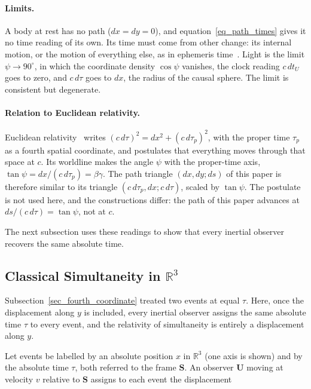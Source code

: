 \documentclass[anonymous]{iopjournal}
\begin{document}
\paragraph{Limits.} A body at rest has no path ($dx=dy=0$), and equation~\eqref{eq_path_times} gives it no time reading of its own. Its time must come from other change: its internal motion, or the motion of everything else, as in ephemeris time~\cite{Barbour2009}. Light is the limit $\psi\to90^\circ$, in which the coordinate density $\cos\psi$ vanishes, the clock reading $c\,dt_U$ goes to zero, and $c\,d\tau$ goes to $dx$, the radius of the causal sphere. The limit is consistent but degenerate.

\paragraph{Relation to Euclidean relativity.} Euclidean relativity~\cite{Montanus2001,Almeida2001} writes $(c\,d\tau)^2=dx^2+(c\,d\tau_p)^2$, with the proper time $\tau_p$ as a fourth spatial coordinate, and postulates that everything moves through that space at $c$. Its worldline makes the angle $\psi$ with the proper-time axis, $\tan\psi=dx/(c\,d\tau_p)=\beta\gamma$. The path triangle $(dx,dy;ds)$ of this paper is therefore similar to its triangle $(c\,d\tau_p,dx;c\,d\tau)$, scaled by $\tan\psi$. The postulate is not used here, and the constructions differ: the path of this paper advances at $ds/(c\,d\tau)=\tan\psi$, not at $c$.

The next subsection uses these readings to show that every inertial observer recovers the same absolute time.

\subsection{Classical Simultaneity in \texorpdfstring{$\mathbb{R}^3$}{R3}}\label{sec_classical_simultaneity}

Subsection~\ref{sec_fourth_coordinate} treated two events at equal $\tau$. Here, once the displacement along $y$ is included, every inertial observer assigns the same absolute time $\tau$ to every event, and the relativity of simultaneity is entirely a displacement along $y$.

Let events be labelled by an absolute position $x$ in $\mathbb{R}^3$ (one axis is shown) and by the absolute time $\tau$, both referred to the frame $\mathbf{S}$. An observer $\mathbf{U}$ moving at velocity $v$ relative to $\mathbf{S}$ assigns to each event the displacement
\end{document}
